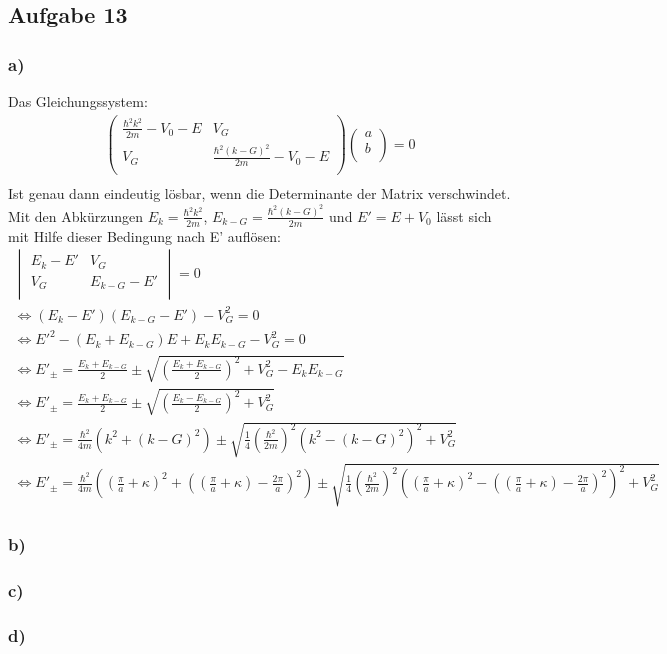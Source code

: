 \subsection*{Aufgabe 13}
\subsubsection*{a)}
Das Gleichungssystem:
\begin{align*}
\begin{pmatrix}
\frac{\hbar^2k^2}{2m}-V_0-E & V_G\\
V_G & \frac{\hbar^2(k-G)^2}{2m}-V_0-E\\
\end{pmatrix}
\begin{pmatrix}
a\\
b\\
\end{pmatrix}
=0\\
\end{align*}
Ist genau dann eindeutig lösbar, wenn die Determinante der Matrix verschwindet. Mit den Abkürzungen $E_{k} = \frac{\hbar^2k^2}{2m}$, $E_{k-G} = \frac{\hbar^2(k-G)^2}{2m}$ und $E'=E +V_0$ lässt sich mit Hilfe dieser Bedingung nach E' auflösen:
\begin{align*}
\begin{vmatrix}
E_k-E' & V_G\\
V_G & E_{k-G}-E'\\
\end{vmatrix} = 0\\
\Leftrightarrow (E_k-E')(E_{k-G}-E')-V_G^2 = 0\\
\Leftrightarrow E'^2-(E_k+E_{k-G})E+E_kE_{k-G}-V_G^2 = 0\\
\Leftrightarrow E'_\pm =\frac{E_k+E_{k-G}}{2} \pm \sqrt{\left(\frac{E_k+E_{k-G}}{2}\right)^2+V_G^2-E_kE_{k-G}}\\
\Leftrightarrow E'_\pm =\frac{E_k+E_{k-G}}{2} \pm \sqrt{\left(\frac{E_k-E_{k-G}}{2}\right)^2+V_G^2} \\
\Leftrightarrow E'_\pm =\frac{\hbar^2}{4m}(k^2+(k-G)^2) \pm \sqrt{\frac{1}{4}\left(\frac{\hbar^2}{2m}\right)^2(k^2-(k-G)^2)^2+V_G^2}\\
\Leftrightarrow E'_\pm =\frac{\hbar^2}{4m}((\frac{\pi}{a}+\kappa)^2+((\frac{\pi}{a}+\kappa)-\frac{2\pi}{a})^2) \pm \sqrt{\frac{1}{4}\left(\frac{\hbar^2}{2m}\right)^2((\frac{\pi}{a}+\kappa)^2-((\frac{\pi}{a}+\kappa)-\frac{2\pi}{a})^2)^2+V_G^2}
\end{align*}
\subsubsection*{b)}

\subsubsection*{c)}

\subsubsection*{d)}

